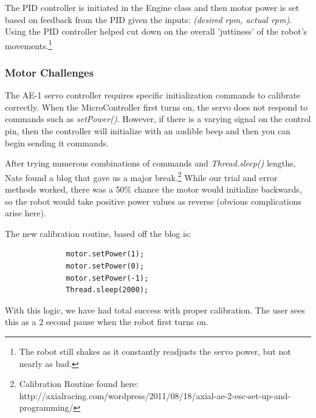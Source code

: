 \documentclass[12pt]{article}
\begin{document}
The PID controller is initiated in the Engine class and then motor power is set based on feedback from the PID given the inputs: \textit{(desired rpm, actual rpm)}.  Using the PID controller helped cut down on the overall 'juttiness' of the robot's movements.\footnote{The robot still shakes as it constantly readjusts the servo power, but not nearly as bad.}

\subsubsection*{Motor Challenges}
The AE-1 servo controller requires specific initialization commands to calibrate correctly.  When the MicroController first turns on, the servo does not respond to commands such as \textit{setPower()}.  However, if there is a varying signal on the control pin, then the controller will initialize with an audible beep and then you can begin sending it commands.

After trying numerous combinations of commands and \textit{Thread.sleep()} lengths, Nate found a blog that gave us a major break.\footnote{Calibration Routine found here: http://axialracing.com/wordpress/2011/08/18/axial-ae-2-esc-set-up-and-programming/}  While our trial and error methods worked, there was a 50\% chance the motor would initialize backwards, so the robot would take positive power values as reverse (obvious complications arise here).

The new calibration routine, based off the blog is:
\begin{verbatim}
              motor.setPower(1);
              motor.setPower(0);
              motor.setPower(-1);
              Thread.sleep(2000);
\end{verbatim}
With this logic, we have had total success with proper calibration.  The user sees this as a 2 second pause when the robot first turns on.

\clearpage
\end{document}
